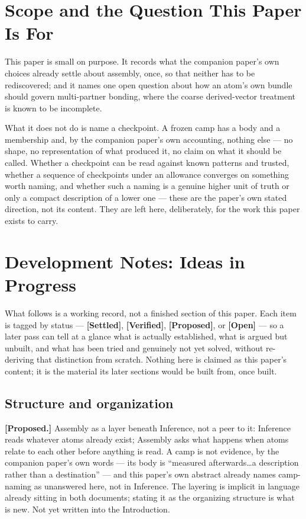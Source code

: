 \documentclass[12pt, a4paper]{article}
\begin{document}
\section{Scope and the Question This Paper Is For}
\label{sec:scope}

This paper is small on purpose. It records what the companion
paper's own choices already settle about assembly, once, so that
neither has to be rediscovered; and it names one open question about
how an atom's own bundle should govern multi-partner bonding, where
the coarse derived-vector treatment is known to be incomplete.

What it does not do is name a checkpoint. A frozen camp has a body
and a membership and, by the companion paper's own accounting,
nothing else --- no shape, no representation of what produced it,
no claim on what it should be called. Whether a checkpoint can be
read against known patterns and trusted, whether a sequence of
checkpoints under an allowance converges on something worth naming,
and whether such a naming is a genuine higher unit of truth or only
a compact description of a lower one --- these are the paper's own
stated direction, not its content. They are left here, deliberately,
for the work this paper exists to carry.

\section*{Development Notes: Ideas in Progress}

What follows is a working record, not a finished section of this
paper. Each item is tagged by status --- \textbf{[Settled]},
\textbf{[Verified]}, \textbf{[Proposed]}, or \textbf{[Open]} --- so a
later pass can tell at a glance what is actually established, what
is argued but unbuilt, and what has been tried and genuinely not
yet solved, without re-deriving that distinction from scratch.
Nothing here is claimed as this paper's content; it is the material
its later sections would be built from, once built.

\subsection*{Structure and organization}

\textbf{[Proposed.]} Assembly as a layer beneath Inference, not a
peer to it: Inference reads whatever atoms already exist; Assembly
asks what happens when atoms relate to each other before anything
is read. A camp is not evidence, by the companion paper's own words
--- its body is ``measured afterwards\ldots a description rather
than a destination'' --- and this paper's own abstract already names
camp-naming as unanswered here, not in Inference. The layering is
implicit in language already sitting in both documents; stating it
as the organizing structure is what is new. Not yet written into
the Introduction.
\end{document}
